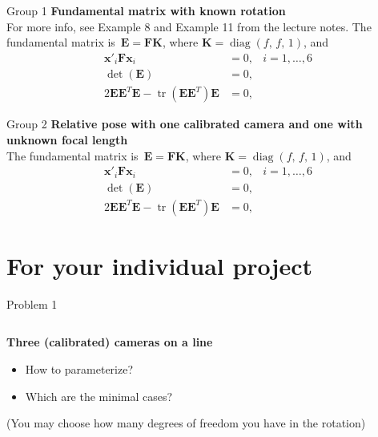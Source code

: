 \documentclass[aspectratio=169]{beamer}
\newcommand{\mat}[1]{\bm{#1}}
\DeclareMathOperator{\tr}{tr}
\DeclareMathOperator{\diag}{diag}
\newcommand{\T}{T}
\begin{document}
\begin{frame}{Group 1}
\textbf{Fundamental matrix with known rotation}\\[8mm]
For more info, see Example 8 and Example 11 from the lecture notes.
The fundamental matrix is~$\mat{E=FK}$, where $\mat{K}=\diag(f,\,f,\,1)$, and
\begin{equation*}
\begin{aligned}
    \mat{x}'_i\mat{F}\mat{x}_i &= 0, &i=1,\ldots,6\\
    \det(\mat{E}) &= 0, &\\
    2\mat{EE}^\T\mat{E}- \tr(\mat{EE}^\T)\mat{E} &= 0, &
\end{aligned}
\end{equation*}
\end{frame}

\begin{frame}{Group 2}
\textbf{Relative pose with one calibrated camera and one with unknown focal length}\\[8mm]
The fundamental matrix is~$\mat{E=FK}$, where $\mat{K}=\diag(f,\,f,\,1)$, and
\begin{equation*}
\begin{aligned}
    \mat{x}'_i\mat{F}\mat{x}_i &= 0, &i=1,\ldots,6\\
    \det(\mat{E}) &= 0, &\\
    2\mat{EE}^\T\mat{E}- \tr(\mat{EE}^\T)\mat{E} &= 0, &
\end{aligned}
\end{equation*}
\end{frame}

\section{For your individual project}

\begin{frame}{Problem 1}
\begin{columns}
    \begin{column}{0.5\textwidth}
        \textbf{Three (calibrated) cameras on a line}\\[8mm]
        \begin{itemize}
            \item How to parameterize?
            \item Which are the minimal cases?
        \end{itemize}
    \vspace{8mm}
    \footnotesize{(You may choose how many degrees of freedom you have in the rotation)}
    \end{column}%
    \begin{column}{0.5\textwidth}
        \centering
        
    \end{column}
\end{columns}
\end{frame}
\end{document}
